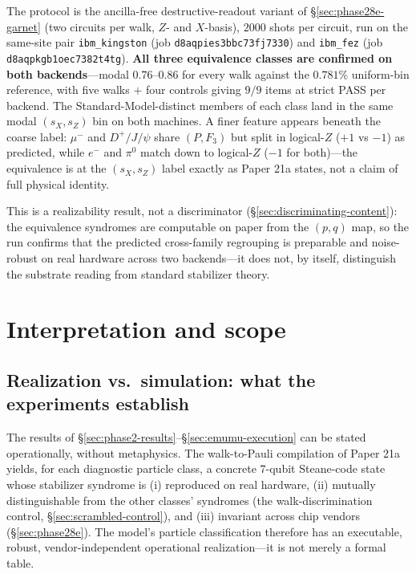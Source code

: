 \documentclass[11pt]{article}
\begin{document}
The protocol is the ancilla-free destructive-readout variant of \S\ref{sec:phase28e-garnet} (two circuits per walk, $Z$- and $X$-basis), $2000$ shots per circuit, run on the same-site pair \texttt{ibm\_kingston} (job \texttt{d8aqpies3bbc73fj7330}) and \texttt{ibm\_fez} (job \texttt{d8aqpkgb1oec7382t4tg}).  \textbf{All three equivalence classes are confirmed on both backends}---modal $0.76$--$0.86$ for every walk against the $0.781\%$ uniform-bin reference, with five walks $+$ four controls giving $9/9$ items at strict PASS per backend.  The Standard-Model-distinct members of each class land in the same modal $(s_X, s_Z)$ bin on both machines.  A finer feature appears beneath the coarse label: $\mu^-$ and $D^+\!/J\!/\psi$ share $(P, F_3)$ but split in logical-$Z$ ($+1$ vs $-1$) as predicted, while $e^-$ and $\pi^0$ match down to logical-$Z$ ($-1$ for both)---the equivalence is at the $(s_X, s_Z)$ label exactly as Paper 21a states, not a claim of full physical identity.

This is a realizability result, not a discriminator (\S\ref{sec:discriminating-content}): the equivalence syndromes are computable on paper from the $(p, q)$ map, so the run confirms that the predicted cross-family regrouping is preparable and noise-robust on real hardware across two backends---it does not, by itself, distinguish the substrate reading from standard stabilizer theory.

\section{Interpretation and scope}
\label{sec:interpretation}

\subsection{Realization vs.\ simulation: what the experiments establish}
\label{sec:realization-vs-simulation}

The results of \S\ref{sec:phase2-results}--\S\ref{sec:emumu-execution} can be stated operationally, without metaphysics.  The walk-to-Pauli compilation of Paper 21a~\cite{Paper21a} yields, for each diagnostic particle class, a concrete $7$-qubit Steane-code state whose stabilizer syndrome is (i) reproduced on real hardware, (ii) mutually distinguishable from the other classes' syndromes (the walk-discrimination control, \S\ref{sec:scrambled-control}), and (iii) invariant across chip vendors (\S\ref{sec:phase28e}).  The model's particle classification therefore has an executable, robust, vendor-independent operational realization---it is not merely a formal table.
\end{document}
